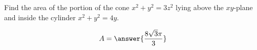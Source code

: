 \documentclass{ximera}
\author{David Guichard \and Neal Koblitz \and H. Jerome Keisler \and Albert Scheller \and Barry Balof \and Mike Wills \and Matthew Carr}
\begin{document}
\begin{exercise}





Find the area of the portion of the cone $x^2+y^2=3z^2$ lying above the $xy$-plane and inside the cylinder $x^2+y^2=4y$.

\begin{prompt}
\[
A=\answer{\frac{8\sqrt{3}\pi}{3}}
\]
\end{prompt}



\end{exercise}
\end{document}
